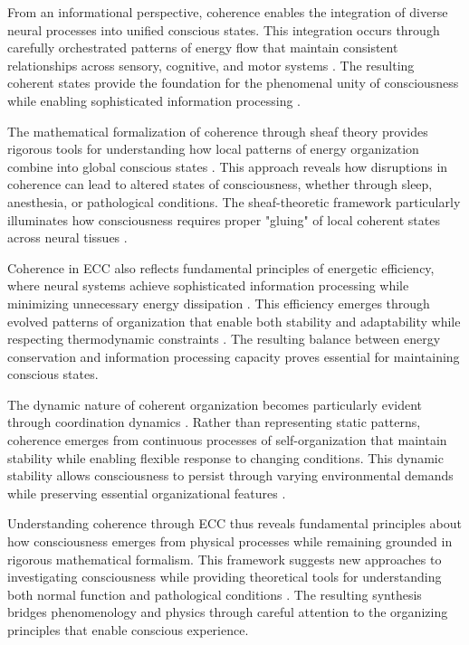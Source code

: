 From an informational perspective, coherence enables the integration of diverse neural processes into unified conscious states. This integration occurs through carefully orchestrated patterns of energy flow that maintain consistent relationships across sensory, cognitive, and motor systems \cite{Baars2007}. The resulting coherent states provide the foundation for the phenomenal unity of consciousness while enabling sophisticated information processing \cite{Tononi2015}.

The mathematical formalization of coherence through sheaf theory provides rigorous tools for understanding how local patterns of energy organization combine into global conscious states \cite{Rushworth2018}. This approach reveals how disruptions in coherence can lead to altered states of consciousness, whether through sleep, anesthesia, or pathological conditions. The sheaf-theoretic framework particularly illuminates how consciousness requires proper "gluing" of local coherent states across neural tissues \cite{Abramsky2008}.

Coherence in ECC also reflects fundamental principles of energetic efficiency, where neural systems achieve sophisticated information processing while minimizing unnecessary energy dissipation \cite{Dehaene2011}. This efficiency emerges through evolved patterns of organization that enable both stability and adaptability while respecting thermodynamic constraints \cite{Bressler2016}. The resulting balance between energy conservation and information processing capacity proves essential for maintaining conscious states.

The dynamic nature of coherent organization becomes particularly evident through coordination dynamics \cite{Kelso2012}. Rather than representing static patterns, coherence emerges from continuous processes of self-organization that maintain stability while enabling flexible response to changing conditions. This dynamic stability allows consciousness to persist through varying environmental demands while preserving essential organizational features \cite{Haken2012}.

Understanding coherence through ECC thus reveals fundamental principles about how consciousness emerges from physical processes while remaining grounded in rigorous mathematical formalism. This framework suggests new approaches to investigating consciousness while providing theoretical tools for understanding both normal function and pathological conditions \cite{Alexander2019}. The resulting synthesis bridges phenomenology and physics through careful attention to the organizing principles that enable conscious experience.

